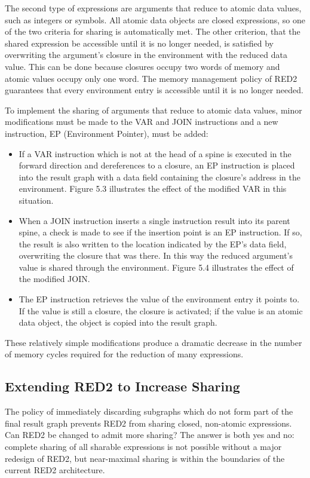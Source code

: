 The second type of expressions are arguments that reduce to atomic data values,
such as integers or symbols. All atomic data objects are closed expressions, so
one of the two criteria for sharing is automatically met. The other criterion,
that the shared expression be accessible until it is no longer needed, is
satisfied by overwriting the argument's closure in the environment with the
reduced data value. This can be done because closures occupy two words of memory
and atomic values occupy only one word. The memory management policy of RED2
guarantees that every environment entry is accessible until it is no longer
needed.

To implement the sharing of arguments that reduce to atomic data values, minor
modifications must be made to the VAR and JOIN instructions and a new
instruction, EP (Environment Pointer), must be added:

\begin{itemize}
\item If a VAR instruction which is not at the head of a spine is executed in
the forward direction and dereferences to a closure, an EP instruction is placed
into the result graph with a data field containing the closure's address in the
environment. Figure 5.3 illustrates the effect of the modified VAR in this
situation.
\item When a JOIN instruction inserts a single instruction result into its
parent spine, a check is made to see if the insertion point is an EP
instruction. If so, the result is also written to the location indicated by the
EP's data field, overwriting the closure that was there. In this way the reduced
argument's value is shared through the environment. Figure 5.4 illustrates the
effect of the modified JOIN.
\item The EP instruction retrieves the value of the environment entry it points
to. If the value is still a closure, the closure is activated; if the value is
an atomic data object, the object is copied into the result graph.
\end{itemize}

These relatively simple modifications produce a dramatic decrease in the number
of memory cycles required for the reduction of many expressions.

\subsection{Extending RED2 to Increase Sharing}

The policy of immediately discarding subgraphs which do not form part of the
final result graph prevents RED2 from sharing closed, non-atomic expressions.
Can RED2 be changed to admit more sharing? The answer is both yes and no:
complete sharing of all sharable expressions is not possible without a major
redesign of RED2, but near-maximal sharing is within the boundaries of the
current RED2 architecture.

